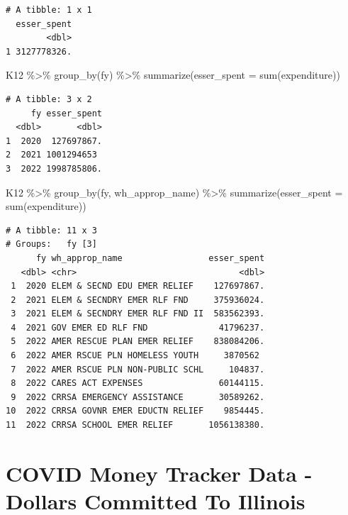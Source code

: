 \documentclass[
  letterpaper,
  DIV=11,
  numbers=noendperiod]{scrreport}
\newenvironment{Shaded}{\begin{snugshade}}{\end{snugshade}}
\newcommand{\AttributeTok}[1]{\textcolor[rgb]{0.40,0.45,0.13}{#1}}
\newcommand{\FunctionTok}[1]{\textcolor[rgb]{0.28,0.35,0.67}{#1}}
\newcommand{\NormalTok}[1]{\textcolor[rgb]{0.00,0.23,0.31}{#1}}
\newcommand{\SpecialCharTok}[1]{\textcolor[rgb]{0.37,0.37,0.37}{#1}}
\begin{document}
\begin{verbatim}
# A tibble: 1 x 1
  esser_spent
        <dbl>
1 3127778326.
\end{verbatim}

\begin{Shaded}
\begin{Highlighting}[]
\NormalTok{K12 }\SpecialCharTok{\%\textgreater{}\%} \FunctionTok{group\_by}\NormalTok{(fy) }\SpecialCharTok{\%\textgreater{}\%} \FunctionTok{summarize}\NormalTok{(}\AttributeTok{esser\_spent =} \FunctionTok{sum}\NormalTok{(expenditure))}
\end{Highlighting}
\end{Shaded}

\begin{verbatim}
# A tibble: 3 x 2
     fy esser_spent
  <dbl>       <dbl>
1  2020  127697867.
2  2021 1001294653 
3  2022 1998785806.
\end{verbatim}

\begin{Shaded}
\begin{Highlighting}[]
\NormalTok{K12 }\SpecialCharTok{\%\textgreater{}\%} \FunctionTok{group\_by}\NormalTok{(fy, wh\_approp\_name) }\SpecialCharTok{\%\textgreater{}\%} \FunctionTok{summarize}\NormalTok{(}\AttributeTok{esser\_spent =} \FunctionTok{sum}\NormalTok{(expenditure))}
\end{Highlighting}
\end{Shaded}

\begin{verbatim}
# A tibble: 11 x 3
# Groups:   fy [3]
      fy wh_approp_name                 esser_spent
   <dbl> <chr>                                <dbl>
 1  2020 ELEM & SECND EDU EMER RELIEF    127697867.
 2  2021 ELEM & SECNDRY EMER RLF FND     375936024.
 3  2021 ELEM & SECNDRY EMER RLF FND II  583562393.
 4  2021 GOV EMER ED RLF FND              41796237.
 5  2022 AMER RESCUE PLAN EMER RELIEF    838084206.
 6  2022 AMER RSCUE PLN HOMELESS YOUTH     3870562 
 7  2022 AMER RSCUE PLN NON-PUBLIC SCHL     104837.
 8  2022 CARES ACT EXPENSES               60144115.
 9  2022 CRRSA EMERGENCY ASSISTANCE       30589262.
10  2022 CRRSA GOVNR EMER EDUCTN RELIEF    9854445.
11  2022 CRRSA SCHOOL EMER RELIEF       1056138380.
\end{verbatim}

\hypertarget{sec-covid-money-tracker}{%
\section{COVID Money Tracker Data - Dollars Committed To
Illinois}\label{sec-covid-money-tracker}}
\end{document}
